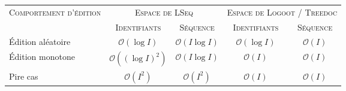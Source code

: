 
\small
\begin{tabularx}{1.2\textwidth}{@{}Xcccc@{}}

  \toprule
  \textsc{Comportement d'édition} & \multicolumn{2}{c}{\textsc{Espace de LSeq}} & \multicolumn{2}{c}{\textsc{Espace de Logoot} / \textsc{Treedoc}} \\ \cmidrule{2-3} \cmidrule{4-5} 
                   & \textsc{Identifiants} & \textsc{Séquence} & \textsc{Identifiants} & \textsc{Séquence} \\ \midrule
  Édition aléatoire & $\mathcal{O}(\log I)$ & $\mathcal{O}(I\log I)$ & $\mathcal{O}(\log I)$ & $\mathcal{O}(I)$\\
  Édition monotone & $\mathcal{O}((\log I)^2)$ & $\mathcal{O}(I \log I)$ & $\mathcal{O}(I)$ & $\mathcal{O}(I)$ \\
  Pire cas & $\mathcal{O}(I^2)$ & $\mathcal{O}(I^2)$ & $\mathcal{O}(I)$ & $\mathcal{O}(I)$  \\ \bottomrule
\end{tabularx}
